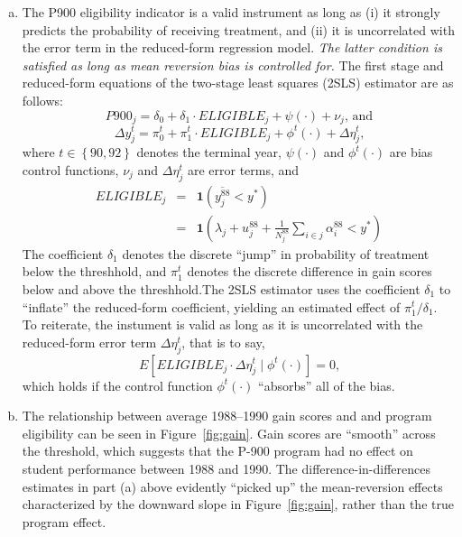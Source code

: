 \documentclass{article}
\begin{document}
\begin{enumerate}[(a)]
\item The P900 eligibility indicator is a valid instrument as long as (i) it strongly predicts the probability of receiving treatment, and (ii) it is uncorrelated with the error term in the reduced-form regression model. {\em The latter condition is satisfied as long as mean reversion bias is controlled for.} The first stage and reduced-form equations of the two-stage least squares (2SLS) estimator are as follows:
\begin{equation}
P900_{j} = \delta_{0}+\delta_{1} \cdot {ELIGIBLE}_{j} + \psi \left(\cdot\right) + \nu_{j}\text{, and}
\end{equation}
\begin{equation}
\Delta y_{j}^{t} = \pi_{0}^{t}+\pi_{1}^{t} \cdot {ELIGIBLE}_{j} + \phi^{t} \left(\cdot\right) + \Delta \eta_{j}^{t}\text{,}
\end{equation}
where $t \in \left\{90,92\right\}$ denotes the terminal year, $\psi \left(\cdot\right)$ and $\phi^{t} \left(\cdot\right)$ are bias control functions, $\nu_{j}$ and $\Delta \eta_{j}^{t}$ are error terms, and
\begin{eqnarray}
 {ELIGIBLE}_{j} &= &\textbf{1}\left(\overline{y_{j}^{88}}<y^{*}\right) \nonumber \\
&= &\textbf{1}\left( \lambda_{j} + u_{j}^{88} + \frac{1}{N_{j}^{88}}\sum_{i \in j}{\alpha_{i}^{88}}<y^{*}\right)
\end{eqnarray}
The coefficient $\delta_{1}$ denotes the discrete ``jump'' in probability of treatment below the threshhold, and $\pi_{1}^{t}$ denotes the discrete difference in gain scores below and above the threshhold.The 2SLS estimator uses the coefficient $\delta_{1}$ to ``inflate'' the reduced-form coefficient, yielding an estimated effect of $\pi_{1}^{t}/\delta_{1}$. To reiterate, the instument is valid as long as it is uncorrelated with the reduced-form error term $\Delta \eta_{j}^{t}$, that is to say,
\begin{equation*}
E \left[{{ELIGIBLE}_{j} \cdot \Delta \eta_{j}^{t} \mid \phi^{t} \left(\cdot\right)}\right]=0\text{,}
\end{equation*}
which holds if the control function $\phi^{t}\left(\cdot\right)$ ``absorbs'' all of the bias.

\item The relationship between average 1988--1990 gain scores and and program eligibility can be seen in Figure~\ref{fig:gain}.  Gain scores are ``smooth'' across the threshold, which suggests that the P-900 program had no effect on student performance between 1988 and 1990. The difference-in-differences estimates in part (a) above evidently ``picked up'' the mean-reversion effects characterized by the downward slope in Figure~\ref{fig:gain}, rather than the true program effect.


\end{enumerate}
\end{document}
